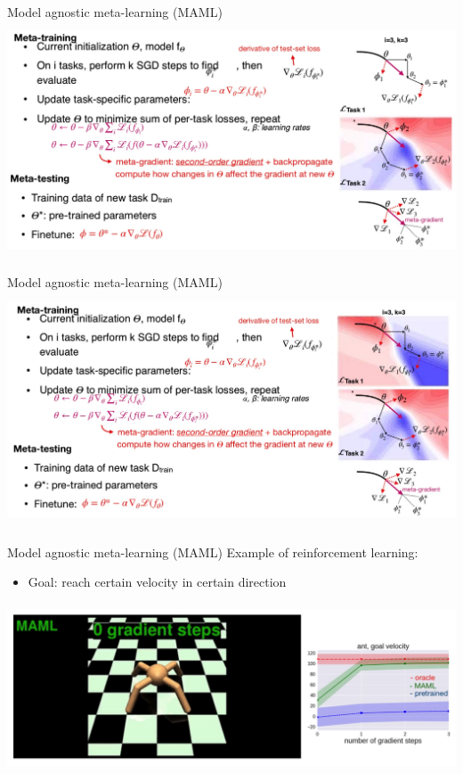 \documentclass[aspectratio=169,t,handout,xcolor={usenames,dvipsnames}]{beamer}
\begin{document}
\begin{frame}{Model agnostic meta-learning (MAML)}
    \centering\includegraphics[height=7cm]{image/Jietu20220329-005224.jpg}
\end{frame}
\begin{frame}{Model agnostic meta-learning (MAML)}
    \centering\includegraphics[height=7cm]{image/Jietu20220329-005323.jpg}
\end{frame}
\begin{frame}{Model agnostic meta-learning (MAML)}
    Example of reinforcement learning:
    \begin{itemize}
        \item Goal: reach certain velocity in certain direction
    \end{itemize}
    \centering\includegraphics[height=5cm]{image/Jietu20220329-005513.jpg}
\end{frame}
\end{document}
